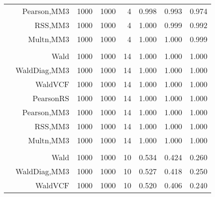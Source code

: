 \documentclass[
]{article}
\begin{document}
\begin{table}[H]
{\begin{tabular}[t]{lrrrrrrr}
\hspace{1em} & Pearson,MM3 & 1000 & 1000 & 4 & 0.998 & 0.993 & 0.974\\

\hspace{1em} & RSS,MM3 & 1000 & 1000 & 4 & 1.000 & 0.999 & 0.992\\

\hspace{1em} & Multn,MM3 & 1000 & 1000 & 4 & 1.000 & 1.000 & 0.999\\
\cmidrule{1-8}
\addlinespace[0.3em]
\multicolumn{8}{l}{\textbf{1F 15V}}\\
\hspace{1em} & Wald & 1000 & 1000 & 14 & 1.000 & 1.000 & 1.000\\

\hspace{1em} & WaldDiag,MM3 & 1000 & 1000 & 14 & 1.000 & 1.000 & 1.000\\

\hspace{1em} & WaldVCF & 1000 & 1000 & 14 & 1.000 & 1.000 & 1.000\\

\hspace{1em} & PearsonRS & 1000 & 1000 & 14 & 1.000 & 1.000 & 1.000\\

\hspace{1em} & Pearson,MM3 & 1000 & 1000 & 14 & 1.000 & 1.000 & 1.000\\

\hspace{1em} & RSS,MM3 & 1000 & 1000 & 14 & 1.000 & 1.000 & 1.000\\

\hspace{1em} & Multn,MM3 & 1000 & 1000 & 14 & 1.000 & 1.000 & 1.000\\
\cmidrule{1-8}
\addlinespace[0.3em]
\multicolumn{8}{l}{\textbf{2F 10V}}\\
\hspace{1em} & Wald & 1000 & 1000 & 10 & 0.534 & 0.424 & 0.260\\

\hspace{1em} & WaldDiag,MM3 & 1000 & 1000 & 10 & 0.527 & 0.418 & 0.250\\

\hspace{1em} & WaldVCF & 1000 & 1000 & 10 & 0.520 & 0.406 & 0.240\\


\end{tabular}}
\end{table}
\end{document}

